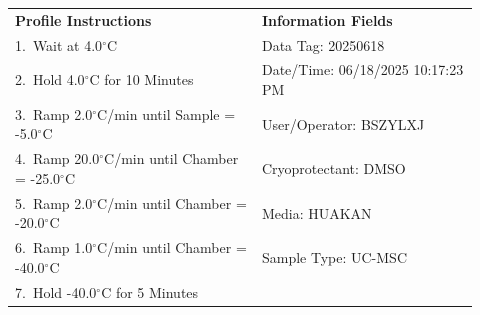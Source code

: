 \documentclass[UTF8,10pt,a4paper,fontset=fandol]{ctexart}
\newcommand{\fieldvalue}[1]{#1}
\begin{document}
\begin{flushleft}
\vspace{4pt}

\begin{tabular}{@{}p{0.49\linewidth}p{0.43\linewidth}@{}}
\textbf{Profile Instructions} & \textbf{Information Fields} \\[2pt]

1.\ Wait at
\fieldvalue{4.0$^\circ$C}
&
Data Tag:
\fieldvalue{20250618}
\\

2.\ Hold
\fieldvalue{4.0$^\circ$C}
for
\fieldvalue{10 Minutes}
&
Date/Time:
\fieldvalue{06/18/2025 10:17:23 PM}
\\

3.\ Ramp
\fieldvalue{2.0$^\circ$C/min}
until Sample =
\fieldvalue{-5.0$^\circ$C}
&
User/Operator:
\fieldvalue{BSZYLXJ}
\\

4.\ Ramp
\fieldvalue{20.0$^\circ$C/min}
until Chamber =
\fieldvalue{-25.0$^\circ$C}
&
Cryoprotectant:
\fieldvalue{DMSO}
\\

5.\ Ramp
\fieldvalue{2.0$^\circ$C/min}
until Chamber =
\fieldvalue{-20.0$^\circ$C}
&
Media:
\fieldvalue{HUAKAN}
\\

6.\ Ramp
\fieldvalue{1.0$^\circ$C/min}
until Chamber =
\fieldvalue{-40.0$^\circ$C}
&
Sample Type:
\fieldvalue{UC-MSC}
\\

7.\ Hold
\fieldvalue{-40.0$^\circ$C}
for
\fieldvalue{5 Minutes}
& \\


\end{tabular}
\end{flushleft}
\end{document}
